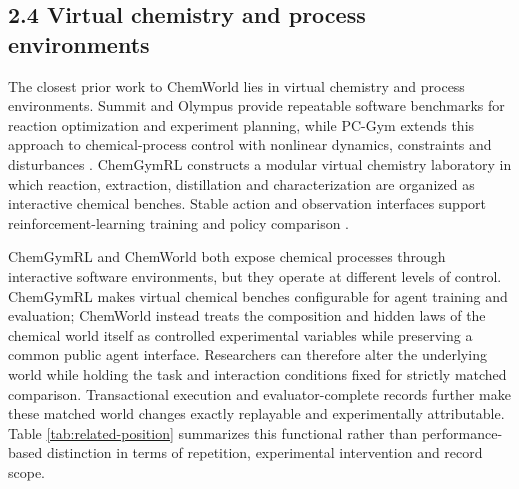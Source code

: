 \documentclass[10pt,twocolumn]{article}
\begin{document}
\subsection{2.4 Virtual chemistry and process
environments}\label{virtual-chemistry-and-process-environments}

The closest prior work to ChemWorld lies in virtual chemistry and
process environments. Summit and Olympus provide repeatable software
benchmarks for reaction optimization and experiment planning, while
PC-Gym extends this approach to chemical-process control with nonlinear
dynamics, constraints and disturbances
\citep{felton2021summit, hase2021olympus, bloor2024pcgym}. ChemGymRL
constructs a modular virtual chemistry laboratory in which reaction,
extraction, distillation and characterization are organized as
interactive chemical benches. Stable action and observation interfaces
support reinforcement-learning training and policy comparison
\citep{beeler2024chemgymrl}.

ChemGymRL and ChemWorld both expose chemical processes through
interactive software environments, but they operate at different levels
of control. ChemGymRL makes virtual chemical benches configurable for
agent training and evaluation; ChemWorld instead treats the composition
and hidden laws of the chemical world itself as controlled experimental
variables while preserving a common public agent interface. Researchers
can therefore alter the underlying world while holding the task and
interaction conditions fixed for strictly matched comparison.
Transactional execution and evaluator-complete records further make
these matched world changes exactly replayable and experimentally
attributable. Table \ref{tab:related-position} summarizes this
functional rather than performance-based distinction in terms of
repetition, experimental intervention and record scope.
\end{document}
